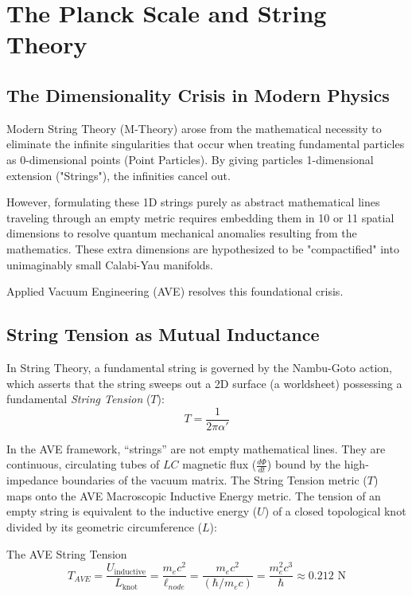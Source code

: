 \chapter{The Planck Scale and String Theory}
\label{ch:string_theory}

\section{The Dimensionality Crisis in Modern Physics}
Modern String Theory (M-Theory) arose from the mathematical necessity to eliminate the infinite singularities that occur when treating fundamental particles as 0-dimensional points (Point Particles). By giving particles 1-dimensional extension ("Strings"), the infinities cancel out.

However, formulating these 1D strings purely as abstract mathematical lines traveling through an empty metric requires embedding them in 10 or 11 spatial dimensions to resolve quantum mechanical anomalies resulting from the mathematics. These extra dimensions are hypothesized to be "compactified" into unimaginably small Calabi-Yau manifolds. 

Applied Vacuum Engineering (AVE) resolves this foundational crisis.

\section{String Tension as Mutual Inductance}
In String Theory, a fundamental string is governed by the Nambu-Goto action, which asserts that the string sweeps out a 2D surface (a worldsheet) possessing a fundamental \textit{String Tension} ($T$):
\begin{equation}
    T = \frac{1}{2\pi\alpha'}
\end{equation}

In the AVE framework, ``strings'' are not empty mathematical lines. They are continuous, circulating tubes of $LC$ magnetic flux ($\frac{d\Phi}{dt}$) bound by the high-impedance boundaries of the vacuum matrix. The String Tension metric ($T$) maps onto the AVE Macroscopic Inductive Energy metric. The tension of an empty string is equivalent to the inductive energy ($U$) of a closed topological knot divided by its geometric circumference ($L$):
\begin{resultbox}{The AVE String Tension}
\begin{equation}
    T_{AVE} = \frac{U_{\text{inductive}}}{L_{\text{knot}}} = \frac{m_e c^2}{\ell_{node}} = \frac{m_e c^2}{(\hbar / m_e c)} = \frac{m_e^2 c^3}{\hbar} \approx 0.212 \text{ N}
\end{equation}
\end{resultbox}

